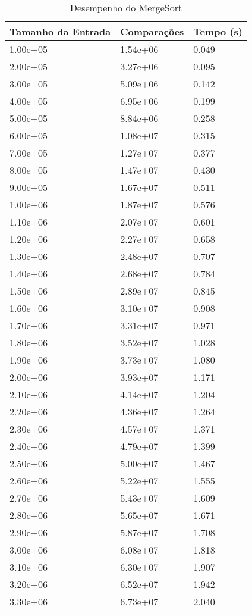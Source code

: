 \begin{table}
\caption{Desempenho do MergeSort}
\label{tab:mergesort}
\begin{tabular}{lll}
\toprule
Tamanho da Entrada & Comparações & Tempo (s) \\
\midrule
1.00e+05 & 1.54e+06 & 0.049 \\
2.00e+05 & 3.27e+06 & 0.095 \\
3.00e+05 & 5.09e+06 & 0.142 \\
4.00e+05 & 6.95e+06 & 0.199 \\
5.00e+05 & 8.84e+06 & 0.258 \\
6.00e+05 & 1.08e+07 & 0.315 \\
7.00e+05 & 1.27e+07 & 0.377 \\
8.00e+05 & 1.47e+07 & 0.430 \\
9.00e+05 & 1.67e+07 & 0.511 \\
1.00e+06 & 1.87e+07 & 0.576 \\
1.10e+06 & 2.07e+07 & 0.601 \\
1.20e+06 & 2.27e+07 & 0.658 \\
1.30e+06 & 2.48e+07 & 0.707 \\
1.40e+06 & 2.68e+07 & 0.784 \\
1.50e+06 & 2.89e+07 & 0.845 \\
1.60e+06 & 3.10e+07 & 0.908 \\
1.70e+06 & 3.31e+07 & 0.971 \\
1.80e+06 & 3.52e+07 & 1.028 \\
1.90e+06 & 3.73e+07 & 1.080 \\
2.00e+06 & 3.93e+07 & 1.171 \\
2.10e+06 & 4.14e+07 & 1.204 \\
2.20e+06 & 4.36e+07 & 1.264 \\
2.30e+06 & 4.57e+07 & 1.371 \\
2.40e+06 & 4.79e+07 & 1.399 \\
2.50e+06 & 5.00e+07 & 1.467 \\
2.60e+06 & 5.22e+07 & 1.555 \\
2.70e+06 & 5.43e+07 & 1.609 \\
2.80e+06 & 5.65e+07 & 1.671 \\
2.90e+06 & 5.87e+07 & 1.708 \\
3.00e+06 & 6.08e+07 & 1.818 \\
3.10e+06 & 6.30e+07 & 1.907 \\
3.20e+06 & 6.52e+07 & 1.942 \\
3.30e+06 & 6.73e+07 & 2.040 \\

\end{tabular}
\end{table}

